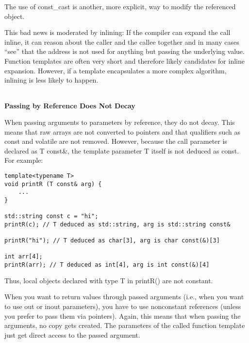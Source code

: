 \begin{tcolorbox}[colback=webgreen!5!white,colframe=webgreen!75!black]
\hspace*{0.75cm}The use of const\_cast is another, more explicit, way to modify the referenced object.
\end{tcolorbox}

This bad news is moderated by inlining: If the compiler can expand the call inline, it can reason about the caller and the callee together and in many cases “see” that the address is not used for anything but passing the underlying value. Function templates are often very short and therefore likely candidates for inline expansion. However, if a template encapsulates a more complex algorithm, inlining is less likely to happen.

\hspace*{\fill} \\ %
\noindent
\textbf{Passing by Reference Does Not Decay}

When passing arguments to parameters by reference, they do not decay. This means that raw arrays are not converted to pointers and that qualifiers such as const and volatile are not removed. However, because the call parameter is declared as T const\&, the template parameter T itself is not deduced as const. For example:

\begin{lstlisting}[style=styleCXX]
template<typename T>
void printR (T const& arg) {
	...
}

std::string const c = "hi";
printR(c); // T deduced as std::string, arg is std::string const&

printR("hi"); // T deduced as char[3], arg is char const(&)[3]

int arr[4];
printR(arr); // T deduced as int[4], arg is int const(&)[4]
\end{lstlisting}

Thus, local objects declared with type T in printR() are not constant.


When you want to return values through passed arguments (i.e., when you want to use out or inout parameters), you have to use nonconstant references (unless you prefer to pass them via pointers). Again, this means that when passing the arguments, no copy gets created. The parameters of the called function template just get direct access to the passed argument.

